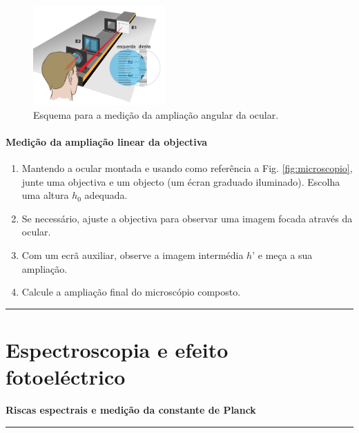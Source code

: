 \documentclass[a4paper,twoside,11pt]{report}      %
\newcommand{\HRule}{\rule{\linewidth}{0.5mm}}
\begin{document}
\begin{figure}[h]
\begin{center}
	\includegraphics[width=0.45\textwidth]{micro-composto}
\caption{Esquema para a medição da ampliação angular da ocular.}
\label{fig:micro-composto}
\end{center}
\end{figure}

\subsubsection*{\sf Medição da ampliação linear da objectiva}
\begin{enumerate}[resume]
\item Mantendo a ocular montada e usando como referência a Fig. \ref{fig:microscopio}, junte uma objectiva e um objecto (um écran graduado iluminado). Escolha uma altura $h_0$ adequada.
\item Se necessário, ajuste a objectiva para observar uma imagem focada através da ocular.
\item Com um ecrã auxiliar, observe a imagem intermédia $h’$ e meça a sua ampliação.
\item Calcule a ampliação final do microscópio composto.
\end{enumerate}
\HRule

\chapter{\huge{Espectroscopia e efeito fotoeléctrico}}
\large {\bf {Riscas espectrais e medição da constante de Planck}}\\
	\HRule %
\end{document}

